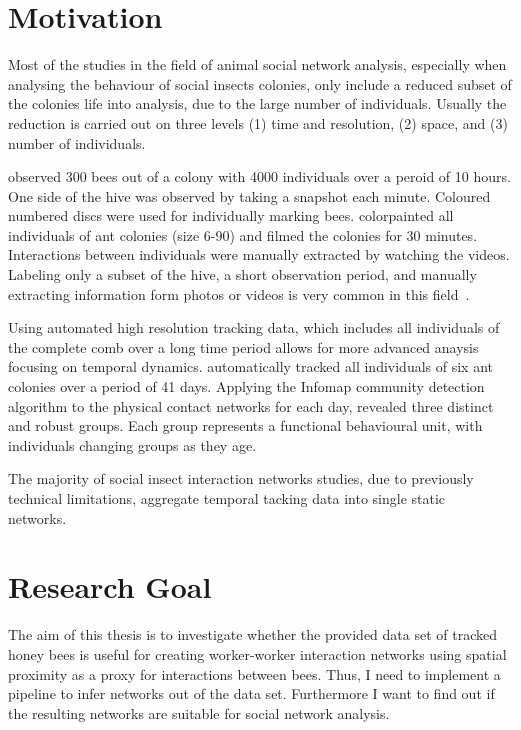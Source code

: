 \section{Motivation}
Most of the studies in the field of animal social network analysis, especially when analysing the behaviour of social insects colonies, only include a reduced subset of the colonies life into analysis, due to the large number of individuals. Usually the reduction is carried out on three levels (1) time and resolution, (2) space, and (3) number of individuals.

\textcite{baracchi2014socio} observed 300 bees out of a colony with 4000 individuals over a peroid of 10 hours. One side of the hive was observed by taking a snapshot each minute. Coloured numbered discs were used for individually marking bees. \textcite{blonder2011time} colorpainted all individuals of ant colonies (size 6-90) and filmed the colonies for 30 minutes. Interactions between individuals were manually extracted by watching the videos. Labeling only a subset of the hive, a short observation period, and manually extracting information form photos or videos is very common in this field~\cite{naug2008structure, quevillon2015social}.

Using automated high resolution tracking data, which includes all individuals of the complete comb over a long time period allows for more advanced anaysis focusing on temporal dynamics. \textcite{mersch2013tracking} automatically tracked all individuals of six ant colonies over a period of 41 days. Applying the Infomap community detection algorithm to the physical contact networks for each day, revealed three distinct and robust groups. Each group represents a functional behavioural unit, with individuals changing groups as they age.

The majority of social insect interaction networks studies, due to previously technical limitations, aggregate temporal tacking data into single static networks.~\cite[Chapter~15]{krause2014animal} 


\section{Research Goal}

The aim of this thesis is to investigate whether the provided data set of tracked honey bees is useful for creating worker-worker interaction networks using spatial proximity as a proxy for interactions between bees. Thus, I need to implement a pipeline to infer networks out of the data set. Furthermore I want to find out if the resulting networks are suitable for social network analysis.


